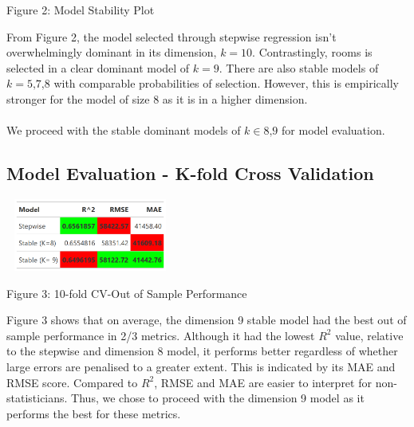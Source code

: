 \documentclass[letterpaper,9pt,twocolumn,twoside,]{pinp}
\begin{document}
\vspace{-10pt}

\centerline{\small Figure 2: Model Stability Plot}
\smallskip

\noindent From Figure 2, the model selected through stepwise regression
isn't overwhelmingly dominant in its dimension, \(k=10\). Contrastingly,
rooms is selected in a clear dominant model of \(k=9\). There are also
stable models of \(k=\text{5,7,8}\) with comparable probabilities of
selection. However, this is empirically stronger for the model of size 8
as it is in a higher dimension.\\
~\\
\noindent We proceed with the stable dominant models of
\(k \in \text{{8,9}}\) for model evaluation.

\hypertarget{model-evaluation---k-fold-cross-validation}{%
\subsection{Model Evaluation - K-fold Cross
Validation}\label{model-evaluation---k-fold-cross-validation}}

\begin{center}\includegraphics[width=210px,height=90px]{Rdata_Files/model_comparison_table} \end{center}
\vspace{-7pt}
\centerline{\small Figure 3: 10-fold CV-Out of Sample Performance}

\hfill\break
\noindent  Figure 3 shows that on average, the dimension 9 stable model
had the best out of sample performance in 2/3 metrics. Although it had
the lowest \(R^2\) value, relative to the stepwise and dimension 8
model, it performs better regardless of whether large errors are
penalised to a greater extent. This is indicated by its MAE and RMSE
score. Compared to \(R^2\), RMSE and MAE are easier to interpret for
non-statisticians. Thus, we chose to proceed with the dimension 9 model
as it performs the best for these metrics.
\end{document}
